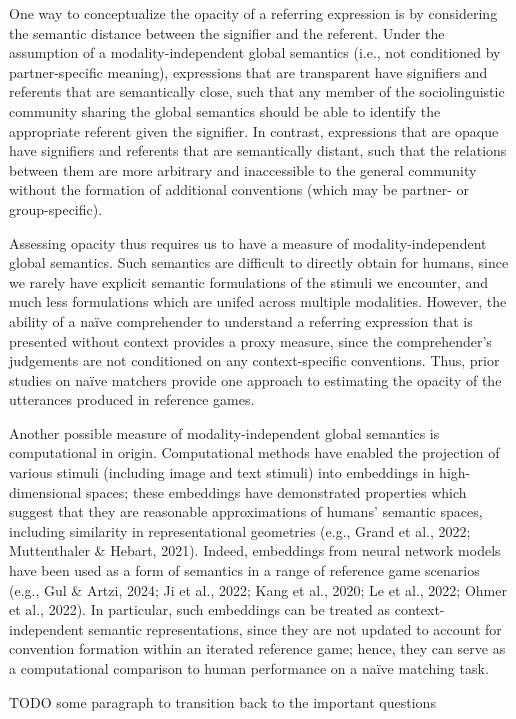 \documentclass[10pt, letterpaper]{article}
\begin{document}
One way to conceptualize the opacity of a referring expression is by
considering the semantic distance between the signifier and the
referent. Under the assumption of a modality-independent global
semantics (i.e., not conditioned by partner-specific meaning),
expressions that are transparent have signifiers and referents that are
semantically close, such that any member of the sociolinguistic
community sharing the global semantics should be able to identify the
appropriate referent given the signifier. In contrast, expressions that
are opaque have signifiers and referents that are semantically distant,
such that the relations between them are more arbitrary and inaccessible
to the general community without the formation of additional conventions
(which may be partner- or group-specific).

Assessing opacity thus requires us to have a measure of
modality-independent global semantics. Such semantics are difficult to
directly obtain for humans, since we rarely have explicit semantic
formulations of the stimuli we encounter, and much less formulations
which are unifed across multiple modalities. However, the ability of a
naïve comprehender to understand a referring expression that is
presented without context provides a proxy measure, since the
comprehender's judgements are not conditioned on any context-specific
conventions. Thus, prior studies on naïve matchers provide one approach
to estimating the opacity of the utterances produced in reference games.

Another possible measure of modality-independent global semantics is
computational in origin. Computational methods have enabled the
projection of various stimuli (including image and text stimuli) into
embeddings in high-dimensional spaces; these embeddings have
demonstrated properties which suggest that they are reasonable
approximations of humans' semantic spaces, including similarity in
representational geometries (e.g., Grand et al., 2022; Muttenthaler \&
Hebart, 2021). Indeed, embeddings from neural network models have been
used as a form of semantics in a range of reference game scenarios
(e.g., Gul \& Artzi, 2024; Ji et al., 2022; Kang et al., 2020; Le et
al., 2022; Ohmer et al., 2022). In particular, such embeddings can be
treated as context-independent semantic representations, since they are
not updated to account for convention formation within an iterated
reference game; hence, they can serve as a computational comparison to
human performance on a naïve matching task.

TODO some paragraph to transition back to the important questions
\end{document}
